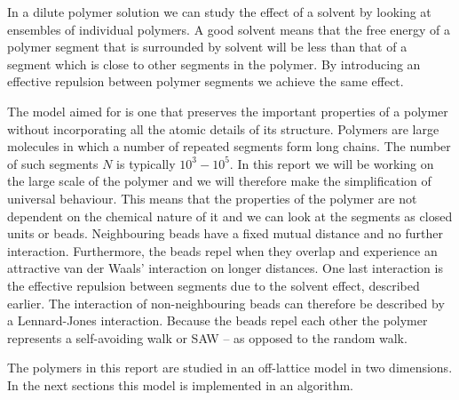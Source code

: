 In a dilute polymer solution we can study the effect of a solvent by looking at ensembles of individual polymers. A good solvent means that the free energy of a polymer segment that is surrounded by solvent will be less than that of a segment which is close to other segments in the polymer. By introducing an effective repulsion between polymer segments we achieve the same effect.

The model aimed for is one that preserves the important properties of a polymer without incorporating all the atomic details of its structure. Polymers are large molecules in which a number of repeated segments form long chains. The number of such segments $N$ is typically $10^3 - 10^5$. In this report we will be working on the large scale of the polymer and we will therefore make the simplification of universal behaviour. This means that the properties of the polymer are not dependent on the chemical nature of it and we can look at the segments as closed units or beads. Neighbouring beads have a fixed mutual distance and no further interaction. Furthermore, the beads repel when they overlap and experience an attractive van der Waals' interaction on longer distances. One last interaction is the effective repulsion between segments due to the solvent effect, described earlier. The interaction of non-neighbouring beads can therefore be described by a Lennard-Jones interaction. Because the beads repel each other the polymer represents a self-avoiding walk or SAW -- as opposed to the random walk.

The polymers in this report are studied in an off-lattice model in two dimensions. In the next sections this model is implemented in an algorithm.